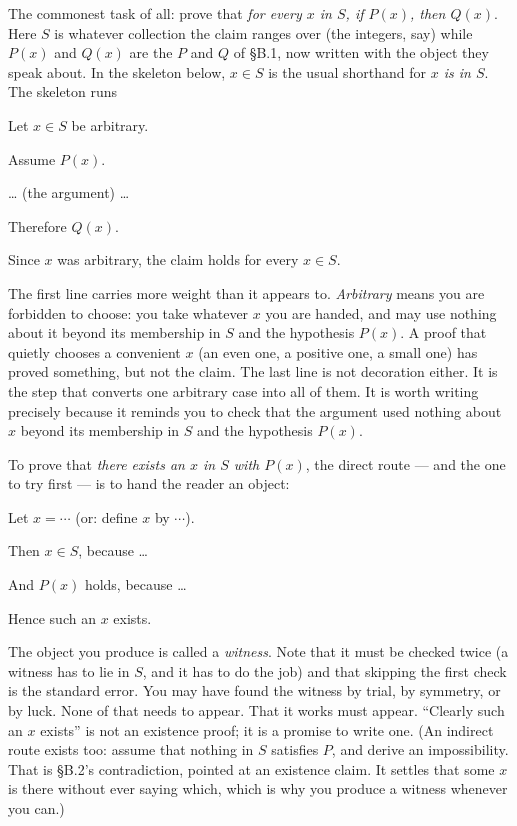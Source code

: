 \documentclass[a4paper,12pt,oneside]{memoir}
\begin{document}
 The commonest task of all: prove that \emph{for every \(x\) in \(S\), if \(P(x)\), then \(Q(x)\)}. Here \(S\) is whatever collection the claim ranges over (the integers, say) while \(P(x)\) and \(Q(x)\) are the \(P\) and \(Q\) of §B.1, now written with the object they speak about. In the skeleton below, \(x \in S\) is the usual shorthand for \emph{\(x\) is in \(S\)}. The skeleton runs

\begin{steps}
  \item Let \(x \in S\) be arbitrary.
  \item Assume \(P(x)\).
  \item … (the argument) …
  \item Therefore \(Q(x)\).
  \item Since \(x\) was arbitrary, the claim holds for every \(x \in S\).
\end{steps}
The first line carries more weight than it appears to. \emph{Arbitrary} means you are forbidden to choose: you take whatever \(x\) you are handed, and may use nothing about it beyond its membership in \(S\) and the hypothesis \(P(x)\). A proof that quietly chooses a convenient \(x\) (an even one, a positive one, a small one) has proved something, but not the claim. The last line is not decoration either. It is the step that converts one arbitrary case into all of them. It is worth writing precisely because it reminds you to check that the argument used nothing about \(x\) beyond its membership in \(S\) and the hypothesis \(P(x)\).

 To prove that \emph{there exists an \(x\) in \(S\) with \(P(x)\)}, the direct route — and the one to try first — is to hand the reader an object:

\begin{steps}
  \item Let \(x = \cdots\) (or: define \(x\) by \(\cdots\)).
  \item Then \(x \in S\), because …
  \item And \(P(x)\) holds, because …
  \item Hence such an \(x\) exists.
\end{steps}
The object you produce is called a \emph{witness}. Note that it must be checked twice (a witness has to lie in \(S\), and it has to do the job) and that skipping the first check is the standard error. You may have found the witness by trial, by symmetry, or by luck. None of that needs to appear. That it works must appear. “Clearly such an \(x\) exists” is not an existence proof; it is a promise to write one. (An indirect route exists too: assume that nothing in \(S\) satisfies \(P\), and derive an impossibility. That is §B.2’s contradiction, pointed at an existence claim. It settles that some \(x\) is there without ever saying which, which is why you produce a witness whenever you can.)
\end{document}
